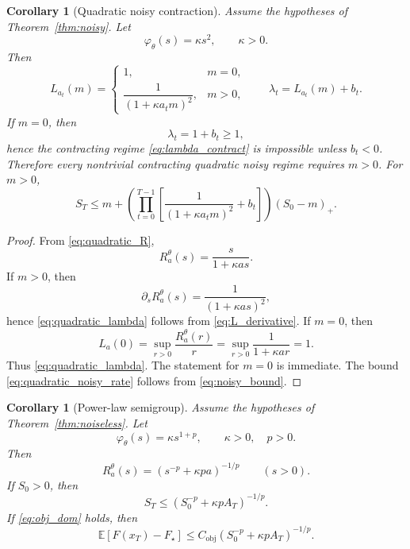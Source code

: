 \documentclass{article}
\newtheorem{corollary}[theorem]{Corollary}
\theoremstyle{definition}
\begin{document}
\begin{corollary}[Quadratic noisy contraction]
\label{cor:quadratic_noisy}
Assume the hypotheses of Theorem~\ref{thm:noisy}.
Let
\[
\varphi_\theta(s)=\kappa s^2,
\qquad
\kappa>0.
\]
Then
\begin{equation}
L_{a_t}(m)
=
\begin{cases}
1, & m=0,\\[4pt]
\dfrac{1}{(1+\kappa a_t m)^2}, & m>0,
\end{cases}
\qquad
\lambda_t=L_{a_t}(m)+b_t.
\label{eq:quadratic_lambda}
\end{equation}
If $m=0$, then
\[
\lambda_t=1+b_t\ge 1,
\]
hence the contracting regime \eqref{eq:lambda_contract} is impossible unless $b_t<0$.
Therefore every nontrivial contracting quadratic noisy regime requires $m>0$.
For $m>0$,
\begin{equation}
S_T
\le
m+
\left(
\prod_{t=0}^{T-1}
\left[
\dfrac{1}{(1+\kappa a_t m)^2}+b_t
\right]
\right)
(S_0-m)_+.
\label{eq:quadratic_noisy_rate}
\end{equation}
\end{corollary}

\begin{proof}
From \eqref{eq:quadratic_R},
\[
R_a^\theta(s)=\frac{s}{1+\kappa a s}.
\]
If $m>0$, then
\[
\partial_sR_a^\theta(s)=\frac{1}{(1+\kappa a s)^2},
\]
hence \eqref{eq:quadratic_lambda} follows from \eqref{eq:L_derivative}.
If $m=0$, then
\[
L_a(0)=\sup_{r>0}\frac{R_a^\theta(r)}{r}
=
\sup_{r>0}\frac{1}{1+\kappa a r}
=
1.
\]
Thus \eqref{eq:quadratic_lambda}. The statement for $m=0$ is immediate. The bound \eqref{eq:quadratic_noisy_rate} follows from \eqref{eq:noisy_bound}.
\end{proof}

\begin{corollary}[Power-law semigroup]
\label{cor:power}
Assume the hypotheses of Theorem~\ref{thm:noiseless}.
Let
\[
\varphi_\theta(s)=\kappa s^{1+p},
\qquad
\kappa>0,\quad p>0.
\]
Then
\begin{equation}
R_a^\theta(s)=\left(s^{-p}+\kappa p a\right)^{-1/p}
\qquad
(s>0).
\label{eq:power_R}
\end{equation}
If $S_0>0$, then
\begin{equation}
S_T
\le
\left(S_0^{-p}+\kappa p A_T\right)^{-1/p}.
\label{eq:power_rate}
\end{equation}
If \eqref{eq:obj_dom} holds, then
\begin{equation*}
\mathbb E[F(x_T)-F_\star]
\le
C_{\mathrm{obj}}
\left(S_0^{-p}+\kappa p A_T\right)^{-1/p}.
\end{equation*}
\end{corollary}
\end{document}
